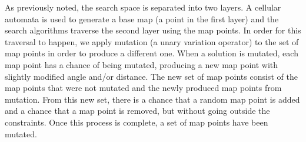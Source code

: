 As previously noted, the search space is separated into two layers. A cellular automata is used to generate a base map (a point in the first layer) and the search algorithms traverse the second layer using the map points. In order for this traversal to happen, we apply mutation (a unary variation operator) to the set of map points in order to produce a different one. When a solution is mutated, each map point has a chance of being mutated, producing a new map point with slightly modified angle and/or distance. The new set of map points consist of the map points that were not mutated and the newly produced map points from mutation. From this new set, there is a chance that a random map point is added and a chance that a map point is removed, but without going outside the constraints. Once this process is complete, a set of map points have been mutated.